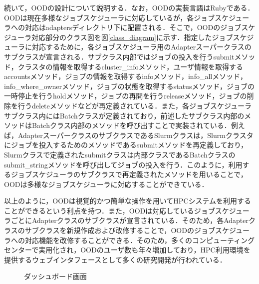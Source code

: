 続いて，OODの設計について説明する．なお，OODの実装言語はRubyである．OODは現在多様なジョブスケジューラに対応しているが，各ジョブスケジューラへの対応はadaptersディレクトリ下に配置される．そこで，OODのジョブスケジューラ対応部分のクラス図を図\ref{class_diagram}に示す．指定したジョブスケジューラに対応するために，各ジョブスケジューラ用のAdapterスーパークラスのサブクラスが宣言される．サブクラス内部ではジョブの投入を行うsubmitメソッド，クラスタの情報を取得するcluster\_infoメソッド，ユーザ情報を取得するaccountsメソッド，ジョブの情報を取得するinfoメソッド，info\_allメソッド，info\_where\_ownerメソッド，ジョブの状態を取得するstatusメソッド，ジョブの一時停止を行うholdメソッド，ジョブの再開を行うreleaseメソッド，ジョブの削除を行うdeleteメソッドなどが再定義されている．また，各ジョブスケジューラサブクラス内にはBatchクラスが定義されており，前述したサブクラス内部のメソッドはBatchクラス内部のメソッドを呼び出すことで実装されている．例えば，AdapterスーパークラスのサブクラスであるSlurmクラスは，Slurmクラスタにジョブを投入するためのメソッドであるsubmitメソッドを再定義しており，Slurmクラスで定義されたsubmitクラスは内部クラスであるBatchクラスのsubmit\_stringメソッドを呼び出してジョブの投入を行う．このように，利用するジョブスケジューラのサブクラスで再定義されたメソッドを用いることで，OODは多様なジョブスケジューラに対応することができている．\par
以上のように，OODは視覚的かつ簡単な操作を用いてHPCシステムを利用することができるという利点を持つ．また，OODは対応しているジョブスケジューラごとにAdapterクラスのサブクラスが宣言されている．そのため，各Adapterクラスのサブクラスを新規作成および改修することで，OODのジョブスケジューラへの対応機能を改修することができる．そのため，多くのコンピューティングセンターで実用化され，OODのユーザ数も年々増加しており，HPC利用環境を提供するウェブインタフェースとして多くの研究開発が行われている．\par

\begin{figure}[t]
    \centering
    \caption{ダッシュボード画面}
    \label{dashboard}
\end{figure}

